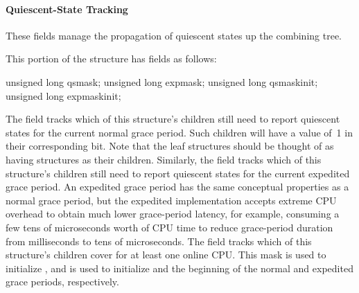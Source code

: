 \paragraph{Quiescent-State Tracking}

These fields manage the propagation of quiescent states up the combining
tree.

This portion of the  structure has fields as follows:

\begin{VerbatimN}
	unsigned long qsmask;
	unsigned long expmask;
	unsigned long qsmaskinit;
	unsigned long expmaskinit;
\end{VerbatimN}

The  field tracks which of this  structure's
children still need to report quiescent states for the current normal
grace period.
Such children will have a value of~1 in their
corresponding bit.
Note that the leaf  structures should be
thought of as having  structures as their children.
Similarly, the  field tracks which of this 
structure's children still need to report quiescent states for the
current expedited grace period.
An expedited grace period has the same
conceptual properties as a normal grace period, but the expedited
implementation accepts extreme CPU overhead to obtain much lower
grace-period latency, for example, consuming a few tens of microseconds
worth of CPU time to reduce grace-period duration from milliseconds to
tens of microseconds.
The  field tracks which of this
 structure's children cover for at least one online CPU\@.
This mask is used to initialize , and  is
used to initialize  and the beginning of the normal and
expedited grace periods, respectively.


